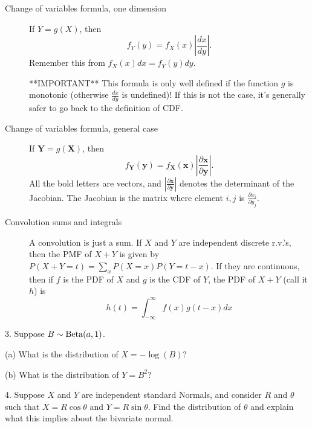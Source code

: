 \documentclass{article}
\begin{document}
\begin{description}
    \item[Change of variables formula, one dimension] If $Y = g(X)$, then $$f_Y(y) = f_X(x)\left|\frac{dx}{dy}\right|.$$
    Remember this from $f_X(x)dx = f_Y(y)dy$.

    **IMPORTANT** This formula is only well defined if the function $g$ is monotonic (otherwise $\frac{dx}{dy}$ is undefined)! If this is not the case, it's generally safer to go back to the definition of CDF.
    
    \item[Change of variables formula, general case] If $\mathbf{Y} = g(\mathbf{X})$, then $$f_\mathbf{Y}(\mathbf{y}) = f_\mathbf{X}(\mathbf{x})\left|\frac{\partial \mathbf{x}}{\partial \mathbf{y}}\right|.$$
    All the bold letters are vectors, and $\left|\frac{\partial \mathbf{x}}{\partial \mathbf{y}}\right|$ denotes the determinant of the Jacobian. The Jacobian is the matrix where element $i, j$ is $\frac{\partial x_i}{\partial y_j}$.
    
    \item[Convolution sums and integrals] A convolution is just a sum. If $X$ and $Y$ are independent discrete r.v.'s, then the PMF of $X+Y$ is given by $P(X+Y=t) = \sum_x P(X=x)P(Y=t-x)$. If they are continuous, then if $f$ is the PDF of $X$ and $g$ is the CDF of $Y$, the PDF of $X+Y$ (call it $h$) is 
    $$h(t) = \int_{-\infty}^{\infty} f(x)g(t-x) dx
    $$
\end{description}

3. Suppose $B \sim \textrm{Beta}(a, 1)$. 

(a) What is the distribution of $X = -\log(B)$? 


(b) What is the distribution of $Y = B^2$?


4. Suppose $X$ and $Y$ are independent standard Normals, and consider $R$ and $\theta$ such that $X = R\cos\theta$ and $Y = R\sin\theta$. Find the distribution of $\theta$ and explain what this implies about the bivariate normal.
\end{document}

